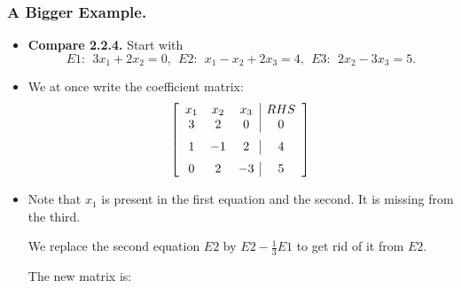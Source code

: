 
\begin{frame}%
  \frametitle{A Bigger Example.}
  \begin{itemize}%
 
\item {\bf Compare 2.2.4.}
Start with
$$E1:~~ 3x_1+2x_2 = 0,~~ E2:~~  
x_1-x_2+2x_3 = 4,~~ E3:~~  2x_2-3x_3 = 5.$$

\item We at once write the coefficient matrix:
$$\left[ \begin {array}{ccc|c}
x_1 & x_2 & x_3 & RHS\\
3&2&0&0\\\noalign{\medskip}
1&-1&2&4\\\noalign{\medskip}
0&2&-3&5\end {array} \right]
$$

\item Note that $x_1$ is present in the first equation and the second.
It is missing from the third.

We replace the second equation $E2$ by $E2-\frac{1}{3}E1$ to get rid of
it from $E2$.

The new matrix is:
\end{itemize}
\end{frame}


